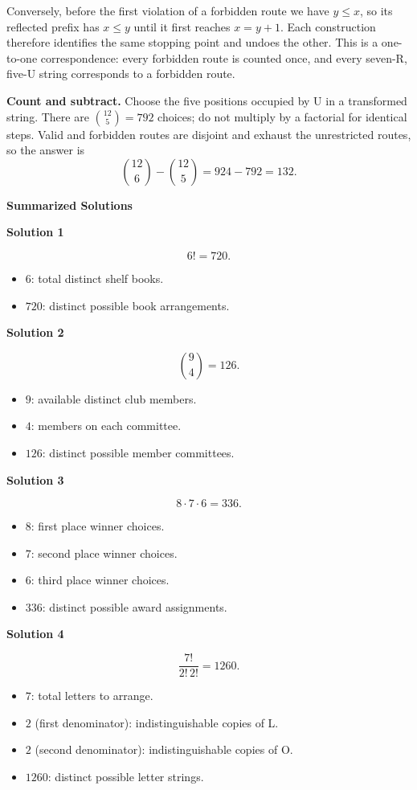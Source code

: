 \documentclass[11pt]{article}
\newcommand{\stageheading}[1]{%
  \par\Needspace{6\baselineskip}%
  \addvspace{.65\baselineskip}%
  {\centering\large\bfseries #1\par}%
  \nopagebreak[4]}
\newcommand{\solution}[1]{%
  \par\Needspace{5\baselineskip}\addvspace{.8\baselineskip}%
  {\large\bfseries Solution #1\par}\nopagebreak[4]}
\begin{document}
Conversely, before the first violation of a forbidden route we have
$y\leq x$, so its reflected prefix has $x\leq y$ until it first reaches
$x=y+1$. Each construction therefore identifies the same stopping point
and undoes the other. This is a one-to-one correspondence: every
forbidden route is counted once, and every seven-R, five-U string
corresponds to a forbidden route.

\textbf{Count and subtract.} Choose the five positions occupied by U
in a transformed string. There are $\binom{12}{5}=792$ choices; do not
multiply by a factorial for identical steps. Valid and forbidden routes
are disjoint and exhaust the unrestricted routes, so the answer is
\[
\binom{12}{6}-\binom{12}{5}=924-792=\boxed{132}.
\]

\clearpage
\stageheading{Summarized Solutions}
\begingroup
{}

\solution{1}
\[
6!=\boxed{720}.
\]
\begin{itemize}
\item \(6\): total distinct shelf books.
\item \(720\): distinct possible book arrangements.
\end{itemize}

\solution{2}
\[
\binom94=\boxed{126}.
\]
\begin{itemize}
\item \(9\): available distinct club members.
\item \(4\): members on each committee.
\item \(126\): distinct possible member committees.
\end{itemize}

\solution{3}
\[
8\cdot7\cdot6=\boxed{336}.
\]
\begin{itemize}
\item \(8\): first place winner choices.
\item \(7\): second place winner choices.
\item \(6\): third place winner choices.
\item \(336\): distinct possible award assignments.
\end{itemize}

\solution{4}
\[
\frac{7!}{2!\,2!}=\boxed{1260}.
\]
\begin{itemize}
\item \(7\): total letters to arrange.
\item \(2\) (first denominator): indistinguishable copies of L.
\item \(2\) (second denominator): indistinguishable copies of O.
\item \(1260\): distinct possible letter strings.
\end{itemize}
\end{document}
